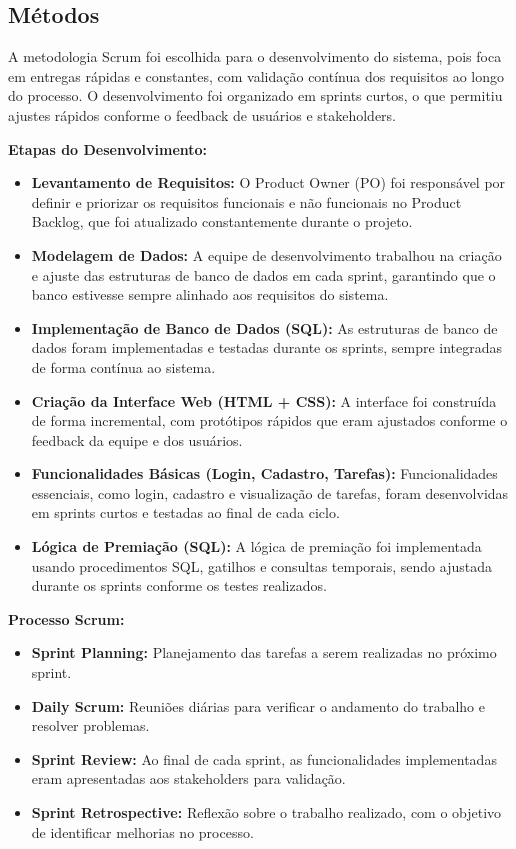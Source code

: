 \documentclass[
	article,			%
	12pt,				%
	oneside,			%
	a4paper,			%
	english,			%
	brazil,				%
	sumario=tradicional
	]{abntex2}
\begin{document}
\subsection{Métodos}

A metodologia Scrum foi escolhida para o desenvolvimento do sistema, pois foca em entregas rápidas e constantes, com validação contínua dos requisitos ao longo do processo. O desenvolvimento foi organizado em sprints curtos, o que permitiu ajustes rápidos conforme o feedback de usuários e stakeholders.

\textbf{Etapas do Desenvolvimento:}
\begin{itemize}
    \item \textbf{Levantamento de Requisitos:} O Product Owner (PO) foi responsável por definir e priorizar os requisitos funcionais e não funcionais no Product Backlog, que foi atualizado constantemente durante o projeto.
    \item \textbf{Modelagem de Dados:} A equipe de desenvolvimento trabalhou na criação e ajuste das estruturas de banco de dados em cada sprint, garantindo que o banco estivesse sempre alinhado aos requisitos do sistema.
    \item \textbf{Implementação de Banco de Dados (SQL):} As estruturas de banco de dados foram implementadas e testadas durante os sprints, sempre integradas de forma contínua ao sistema.
    \item \textbf{Criação da Interface Web (HTML + CSS):} A interface foi construída de forma incremental, com protótipos rápidos que eram ajustados conforme o feedback da equipe e dos usuários.
    \item \textbf{Funcionalidades Básicas (Login, Cadastro, Tarefas):} Funcionalidades essenciais, como login, cadastro e visualização de tarefas, foram desenvolvidas em sprints curtos e testadas ao final de cada ciclo.
    \item \textbf{Lógica de Premiação (SQL):} A lógica de premiação foi implementada usando procedimentos SQL, gatilhos e consultas temporais, sendo ajustada durante os sprints conforme os testes realizados.
\end{itemize}

\textbf{Processo Scrum:}
\begin{itemize}
    \item \textbf{Sprint Planning:} Planejamento das tarefas a serem realizadas no próximo sprint.
    \item \textbf{Daily Scrum:} Reuniões diárias para verificar o andamento do trabalho e resolver problemas.
    \item \textbf{Sprint Review:} Ao final de cada sprint, as funcionalidades implementadas eram apresentadas aos stakeholders para validação.
    \item \textbf{Sprint Retrospective:} Reflexão sobre o trabalho realizado, com o objetivo de identificar melhorias no processo.
\end{itemize}
\end{document}
